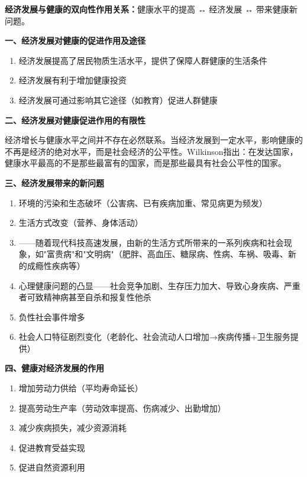 \begin{keybox}
\textbf{经济发展与健康的双向性作用关系：}健康水平的提高 ↔ 经济发展 ↔ 带来健康新问题。

\textbf{一、经济发展对健康的促进作用及途径}
\begin{enumerate}[leftmargin=*]
    \item 经济发展提高了居民物质生活水平，提供了保障人群健康的生活条件
    \item 经济发展有利于增加健康投资
    \item 经济发展可通过影响其它途径（如教育）促进人群健康
\end{enumerate}

\textbf{二、经济发展对健康促进作用的有限性}

经济增长与健康水平之间并不存在必然联系。当经济发展到一定水平，影响健康的不再是经济的绝对水平，而是社会经济的公平性。Wilkinson指出：在发达国家，健康水平最高的不是那些最富有的国家，而是那些最具有社会公平性的国家。

\textbf{三、经济发展带来的新问题}
\begin{enumerate}[leftmargin=*]
    \item 环境的污染和生态破坏（公害病、已有疾病加重、常见病更为频发）
    \item 生活方式改变（营养、身体活动）
    \item {}——随着现代科技高速发展，由新的生活方式所带来的一系列疾病和社会现象，如"富贵病"和"文明病"（肥胖、高血压、糖尿病、性病、车祸、吸毒、新的成瘾性疾病等）
    \item 心理健康问题的凸显——社会竞争加剧、生存压力加大、导致心身疾病、严重者可致精神病甚至自杀和报复性他杀
    \item 负性社会事件增多
    \item 社会人口特征剧烈变化（老龄化、社会流动人口增加→疾病传播+卫生服务提供）
\end{enumerate}

\textbf{四、健康对经济发展的作用}
\begin{enumerate}[leftmargin=*]
    \item 增加劳动力供给（平均寿命延长）
    \item 提高劳动生产率（劳动效率提高、伤病减少、出勤增加）
    \item 减少疾病损失，减少资源消耗
    \item 促进教育受益实现
    \item 促进自然资源利用
\end{enumerate}
\end{keybox}

